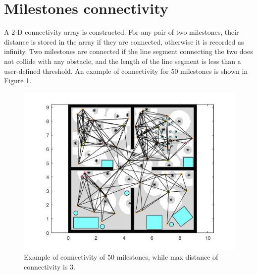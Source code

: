 \documentclass[12pt,draftcls,onecolumn]{IEEEtran}
\begin{document}
\clearpage
\section{Milestones connectivity}
A 2-D connectivity array is constructed.
For any pair of two milestones, their distance is stored in the array if they are connected, otherwise it is recorded as infinity.
Two milestones are connected if the line segment connecting the two does not collide with any obstacle, and the length of the line segment is less than a user-defined threshold. 
An example of connectivity for 50 milestones is shown in Figure \ref{fig:18}.

\begin{figure}
 \centering
  \includegraphics[width=18cm]{figures/connect50MS}
  \caption{Example of connectivity of 50 milestones, while max distance of connectivity is 3.}
  \label{fig:18}
\end{figure}
\end{document}
